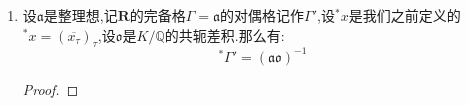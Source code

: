 \begin{enumerate}
\begin{proof}
		在下述同构下,$\textbf{R}^*_+$上的典范测度$\mathrm{d}y/y$对应为$\mathrm{d}^*x\times\mathrm{d}t/t$:
		$$\alpha:\textbf{S}\times\mathbb{R}_+^*,(x,t)\mapsto xt^{1/n}$$
		按照$I=\{t\in\mathbb{R}_+^*\mid1\le t\le e\}$在$\mathrm{d}t/t$下的测度为1,有$\mathrm{vol}(F)$是$F\times I$在$\mathrm{d}^*x\times\mathrm{d}t/t$下的体积.也即$\alpha(F\times I)$在$\mathrm{d}y/y$下的体积.考虑如下复合映射$\psi:$
		$$\xymatrix{\textbf{R}_+^*\ar[r]^{\ln}&\textbf{R}_{\pm}\ar[r]^{\varphi}&\prod_{\mathfrak{p}=\infty}\ar@{=}[r]&\mathbb{R}^r}$$
		这个同构把测度$\mathrm{dy}/y$对应为欧氏空间中的勒贝格测度,于是有:
		$$\mathrm{vol}(F)=\mathrm{vol}_{\mathbb{R}^r}\left(\psi\alpha(F\times I)\right)$$
		下面计算$\psi\alpha(F\times I)$,记$\textbf{1}=(1,\cdots,1)\in\textbf{S}$,于是:
		$$\psi\alpha\left((\textbf{1},t)\right)=\frac{1}{n}\textbf{e}\ln t$$
		其中$\textbf{e}=(e_1,\cdots,e_r)\in\mathbb{R}^r$,如果指标$i$对应的无穷素位$\mathfrak{p}$是实的或者复的,就分别对应$e_i=1$或者2.那么按照$F$的定义就有:
		$$\psi\alpha\left(F\times\{1\}\right)=2\Phi$$
		这里$\Phi$是$G$在迹零空间$H=\{(x_i)\in\mathbb{R}^r\mid\sum_ix_i=0\}$中的基本网孔,于是:
		$$\psi\alpha\left(F\times I\right)=2\Phi+[0,\frac{1}{n}]\textbf{e}$$
		如果记$\Phi$被$\textbf{e}_1,\cdots,\textbf{e}_{r-1}$张成,那么这个像是被$2\textbf{e}_1,\cdots,2\textbf{e}_{r-1},\frac{1}{n}\textbf{e}$生成的平行多面体.于是它的体积是$\frac{1}{n}2^{r-1}$乘以如下行列式:
		$$\left|\begin{array}{cccc}\textbf{e}_{11}&\cdots&\textbf{e}_{r-1,1}&e_1\\\vdots&\ddots&\vdots&\vdots\\\textbf{e}_{1r}&\cdots&\textbf{e}_{r-1,r}&e_r\end{array}\right|$$
		把前$r-1$列加到最后一列中,那么最后一列除了最后一项以外都为零,最后一项是$n$,左上角的主子式是$K$的regulator.得证.
	\end{proof}
	\item 设$\mathfrak{a}$是整理想,记$\textbf{R}$的完备格$\Gamma=\mathfrak{a}$的对偶格记作$\Gamma'$,设${^*x}$是我们之前定义的${^*x}=(\overline{x_{\tau}})_{\tau}$,设$\mathfrak{o}$是$K/\mathbb{Q}$的共轭差积.那么有:
	$${^*\Gamma}'=(\mathfrak{a}\mathfrak{o})^{-1}$$
	\begin{proof}
		

\end{proof}
\end{enumerate}

